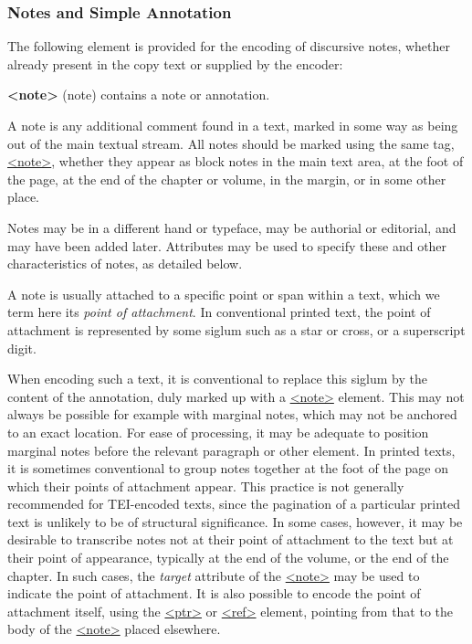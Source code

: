 \subsubsection[{Notes and Simple Annotation}]{Notes and Simple Annotation}\label{CONONO}\par
The following element is provided for the encoding of discursive notes, whether already present in the copy text or supplied by the encoder: 
\begin{sansreflist}
  
\item [\textbf{<note>}] (note) contains a note or annotation.
\end{sansreflist}
\par
A note is any additional comment found in a text, marked in some way as being out of the main textual stream. All notes should be marked using the same tag, \hyperref[TEI.note]{<note>}, whether they appear as block notes in the main text area, at the foot of the page, at the end of the chapter or volume, in the margin, or in some other place.\par
Notes may be in a different hand or typeface, may be authorial or editorial, and may have been added later. Attributes may be used to specify these and other characteristics of notes, as detailed below. \par
A note is usually attached to a specific point or span within a text, which we term here its \textit{point of attachment}. In conventional printed text, the point of attachment is represented by some siglum such as a star or cross, or a superscript digit.\par
When encoding such a text, it is conventional to replace this siglum by the content of the annotation, duly marked up with a \hyperref[TEI.note]{<note>} element. This may not always be possible for example with marginal notes, which may not be anchored to an exact location. For ease of processing, it may be adequate to position marginal notes before the relevant paragraph or other element. In printed texts, it is sometimes conventional to group notes together at the foot of the page on which their points of attachment appear. This practice is not generally recommended for TEI-encoded texts, since the pagination of a particular printed text is unlikely to be of structural significance. In some cases, however, it may be desirable to transcribe notes not at their point of attachment to the text but at their point of appearance, typically at the end of the volume, or the end of the chapter. In such cases, the {\itshape target} attribute of the \hyperref[TEI.note]{<note>} may be used to indicate the point of attachment. It is also possible to encode the point of attachment itself, using the \hyperref[TEI.ptr]{<ptr>} or \hyperref[TEI.ref]{<ref>} element, pointing from that to the body of the \hyperref[TEI.note]{<note>} placed elsewhere.\par
